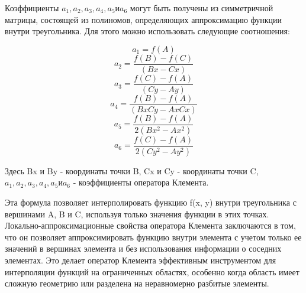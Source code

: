 \documentclass[a4paper, 12pt]{article}%
\begin{document}
	Коэффициенты $ a_1, a_2, a_3, a_4, a_5 и a_6 $ могут быть получены из симметричной матрицы, состоящей из полиномов, определяющих аппроксимацию функции внутри треугольника. Для этого можно использовать следующие соотношения:
	
	$$a_1 = f(A)$$
	$$a_2 = \frac{f(B) - f(C)}{(Bx - Cx)} $$
	$$a_3 = \frac{f(C) - f(A)}{(Cy - Ay)}$$
	$$a_4 = \frac{f(B) - f(A)}{(Bx  Cy - Ax  Cx)} $$
	$$a_5 = \frac{f(B) - f(A)}{2 (Bx^2 - Ax^2)} $$ 
	$$a_6 = \frac{f(C) - f(A)}{2(Cy^2 - Ay^2)} $$
	
	Здесь Bx и By - координаты точки B, Cx и Cy - координаты точки C, $a_1, a_2, a_3, a_4, a_5 и a_6 $ - коэффициенты оператора Клемента.
	
	Эта формула позволяет интерполировать функцию f(x, y) внутри треугольника с вершинами A, B и C, используя только значения функции в этих точках.
	Локально-аппроксимационные свойства оператора Клемента заключаются в том, что он позволяет аппроксимировать функцию внутри элемента с учетом только ее значений в вершинах элемента и без использования информации о соседних элементах. Это делает оператор Клемента эффективным инструментом для интерполяции функций на ограниченных областях, особенно когда область имеет сложную геометрию или разделена на неравномерно разбитые элементы.
	
\end{document}
